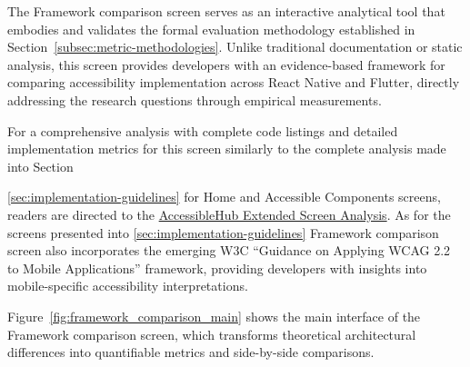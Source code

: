 The Framework comparison screen serves as an interactive analytical tool that embodies and validates the formal evaluation methodology established in Section~\ref{subsec:metric-methodologies}. Unlike traditional documentation or static analysis, this screen provides developers with an evidence-based framework for comparing accessibility implementation across React Native and Flutter, directly addressing the research questions through empirical measurements.

For a comprehensive analysis with complete code listings and detailed implementation metrics for this screen similarly to the complete analysis made into Section~{\ref{sec:implementation-guidelines} for Home and Accessible Components screens, readers are directed to the \href{https://github.com/gabrielrovesti/AccessibleHub/blob/main/Technical\%20Thesis\%20Appendix/AccessibleHub\%20-\%20Extended\%20screen\%20analysis.pdf}{AccessibleHub Extended Screen Analysis}. As for the screens presented into \ref{sec:implementation-guidelines} Framework comparison screen also incorporates the emerging W3C ``Guidance on Applying WCAG 2.2 to Mobile Applications'' \cite{w3c-wcag2mobile} framework, providing developers with insights into mobile-specific accessibility interpretations. 

Figure~\ref{fig:framework_comparison_main} shows the main interface of the Framework comparison screen, which transforms theoretical architectural differences into quantifiable metrics and side-by-side comparisons.

}
